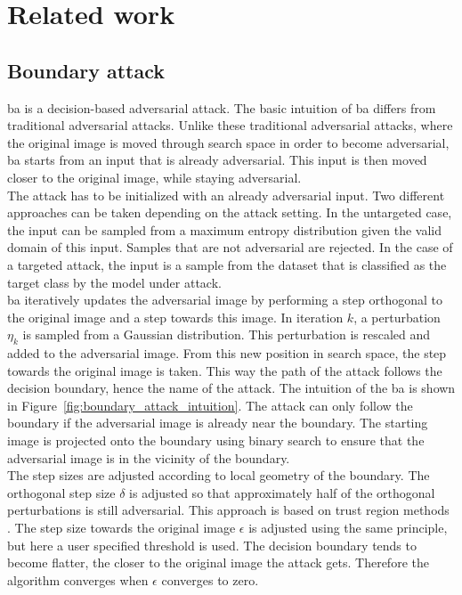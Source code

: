 \chapter{Related work}
\section{Boundary attack}
\gls{ba} \cite{boundary_attack} is a decision-based adversarial attack. The basic intuition of \gls{ba} differs from traditional adversarial attacks. Unlike these traditional adversarial attacks, where the original image is moved through search space in order to become adversarial, \gls{ba} starts from an input that is already adversarial. This input is then moved closer to the original image, while staying adversarial.\\

The attack has to be initialized with an already adversarial input. Two different approaches can be taken depending on the attack setting. In the untargeted case, the input can be sampled from a maximum entropy distribution given the valid domain of this input. Samples that are not adversarial are rejected. In the case of a targeted attack, the input is a sample from the dataset that is classified as the target class by the model under attack.\\

\gls{ba} iteratively updates the adversarial image by performing a step orthogonal to the original image and a step towards this image. In iteration $k$, a perturbation $\eta_k$ is sampled from a Gaussian distribution. This perturbation is rescaled and added to the adversarial image. From this new position in search space, the step towards the original image is taken. This way the path of the attack follows the decision boundary, hence the name of the attack. The intuition of the \gls{ba} is shown in Figure~\ref{fig:boundary_attack_intuition}. The attack can only follow the boundary if the adversarial image is already near the boundary. The starting image is projected onto the boundary using binary search to ensure that the adversarial image is in the vicinity of the boundary.\\

The step sizes are adjusted according to local geometry of the boundary. The orthogonal step size $\delta$ is adjusted so that approximately half of the orthogonal perturbations is still adversarial. This approach is based on trust region methods \cite{trm}. The step size towards the original image $\epsilon$ is adjusted using the same principle, but here a user specified threshold is used. The decision boundary tends to become flatter, the closer to the original image the attack gets. Therefore the algorithm converges when $\epsilon$ converges to zero.\\

